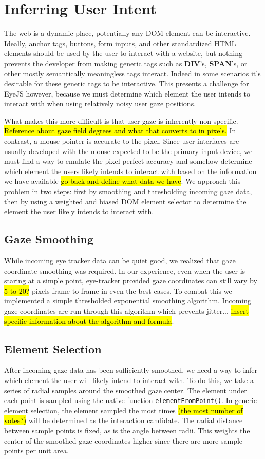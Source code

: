 \documentclass{sigchi}
\begin{document}
\section{Inferring User Intent}
The web is a dynamic place, potentially any DOM element can be interactive. Ideally, anchor tags, buttons, form inputs, and other standardized HTML elements should be used by the user to interact with a website, but nothing prevents the developer from making generic tags such as \textbf{DIV}'s, \textbf{SPAN}'s, or other mostly semantically meaningless tags interact. Indeed in some scenarios it's desirable for these generic tags to be interactive. This presents a challenge for EyeJS however, because we must determine which element the user intends to interact with when using relatively noisy user gaze positions.

What makes this more difficult is that user gaze is inherently non-specific. \hl{Reference about gaze field degrees and what that converts to in pixels.} In contrast, a mouse pointer is accurate to-the-pixel. Since user interfaces are usually developed with the mouse expected to be the primary input device, we must find a way to emulate the pixel perfect accuracy and somehow determine which element the users likely intends to interact with based on the information we have available \hl{go back and define what data we have}. We approach this problem in two steps: first by smoothing and thresholding incoming gaze data, then by using a weighted and biased DOM element selector to determine the element the user likely intends to interact with.


\subsection{Gaze Smoothing}
While incoming eye tracker data can be quiet good, we realized that gaze coordinate smoothing was required. In our experience, even when the user is staring at a simple point, eye-tracker provided gaze coordinates can still vary by \hl{5 to 20?} pixels frame-to-frame in even the best cases. To combat this we implemented a simple thresholded exponential smoothing algorithm. Incoming gaze coordinates are run through this algorithm which prevents jitter... \hl{insert specific information about the algorithm and formula}.


\subsection{Element Selection}
After incoming gaze data has been sufficiently smoothed, we need a way to infer which element the user will likely intend to interact with. To do this, we take a series of radial samples around the smoothed gaze center. The element under each point is sampled using the native function \texttt{elementFromPoint()}. In generic element selection, the element sampled the most times \hl{(the most number of votes?)} will be determined as the interaction candidate. The radial distance between sample points is fixed, as is the angle between radii. This weights the center of the smoothed gaze coordinates higher since there are more sample points per unit area.
\end{document}
